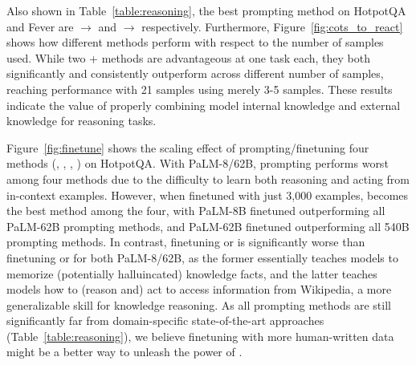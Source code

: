  Also shown in Table~\ref{table:reasoning}, the best prompting method on HotpotQA and Fever are \model{} $\to$ \reasons{} and \reasons{}  $\to$  \model{} respectively. Furthermore, Figure~\ref{fig:cots_to_react} shows how different methods perform with respect to the number of \reasons{} samples used. While two \model{} + \reasons{} methods are advantageous at one task each, they both significantly and consistently outperform \reasons{} across different number of samples, reaching \reasons{} performance with 21 samples using merely 3-5 samples. These results indicate the value of properly combining model internal knowledge and external knowledge for reasoning tasks. 



 Figure~\ref{fig:finetune} shows the scaling effect of prompting/finetuning four methods (\palm{}, \reason{}, \act{}, \model{}) on HotpotQA. With PaLM-8/62B, prompting \model{} performs worst among four methods due to the difficulty to learn both reasoning and acting from in-context examples. However, when finetuned with just 3,000 examples, \model{} becomes the best method among the four, with PaLM-8B finetuned \model{} outperforming all PaLM-62B prompting methods, and PaLM-62B finetuned \model{} outperforming all 540B prompting methods. In contrast, finetuning \palm{} or \reason{} is significantly worse than finetuning \model{} or \act{} for both PaLM-8/62B, as the former essentially teaches models to memorize (potentially halluincated) knowledge facts, and the latter teaches models how to (reason and) act to access information from Wikipedia, a more generalizable skill for knowledge reasoning. 
As all prompting methods are still significantly far from domain-specific state-of-the-art approaches (Table~\ref{table:reasoning}), we believe finetuning with more human-written data might be a better way to unleash the power of \model{}. 





